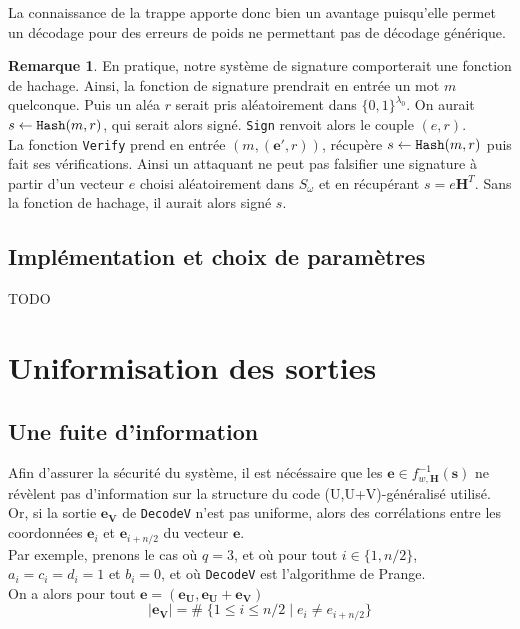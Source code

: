 \documentclass[12pt]{article}
\theoremstyle{plain}
\theoremstyle{definition}
\newtheorem{remarque}[thm]{Remarque}
\newcommand{\e}{\mathbf{e}}
\begin{document}
\noindent La connaissance de la trappe apporte donc bien un avantage puisqu'elle permet un décodage pour des erreurs de poids ne permettant pas de décodage générique. 

\begin{remarque} En pratique, notre système de signature comporterait une fonction de hachage. Ainsi, la fonction de signature prendrait en entrée un mot $m$ quelconque. Puis un aléa $r$ serait pris aléatoirement dans $\{0,1\}^{\lambda_0}$. On aurait $s \leftarrow \verb|Hash| (m,r)$, qui serait alors signé. \verb|Sign| renvoit alors le couple $(e,r)$. \\
La fonction \verb|Verify| prend en entrée $(m,(\e',r))$, récupère $s \leftarrow \verb|Hash| (m,r)$ puis fait ses vérifications. Ainsi un attaquant ne peut pas falsifier une signature à partir d'un vecteur $e$ choisi aléatoirement dans $S_{\omega}$ et en récupérant $s = e\mathbf{H}^T$. Sans la fonction de hachage, il aurait alors signé $s$.
\end{remarque}

\subsection{Implémentation et choix de paramètres}
TODO \\
\section{Uniformisation des sorties}

\subsection{Une fuite d'information}
Afin d'assurer la sécurité du système, il est nécéssaire que les $\mathbf{e} \in f_{w,\mathbf{H}}^{-1}(\mathbf{s})$ ne révèlent pas d'information sur la structure du code (U,U+V)-généralisé utilisé. \\
Or, si la sortie $\mathbf{e_V}$ de \verb|DecodeV| n'est pas uniforme, alors des corrélations entre les coordonnées $\mathbf{e}_i$ et $\mathbf{e}_{i+n/2}$ du vecteur $\mathbf{e}$. \\
Par exemple, prenons le cas où $q=3$, et où pour tout $i \in \{1,n/2\}$, $a_i = c_i = d_i = 1$ et $b_i = 0$, et où \verb|DecodeV| est l'algorithme de Prange. \\
On a alors pour tout $\mathbf{e} = (\mathbf{e_U},\mathbf{e_U}+\mathbf{e_V})$
$$ |\mathbf{e_V}| = \# \; \{1  \leq i \leq n/2 \;|\; e_i \neq e_{i+n/2}\}$$
\end{document}

